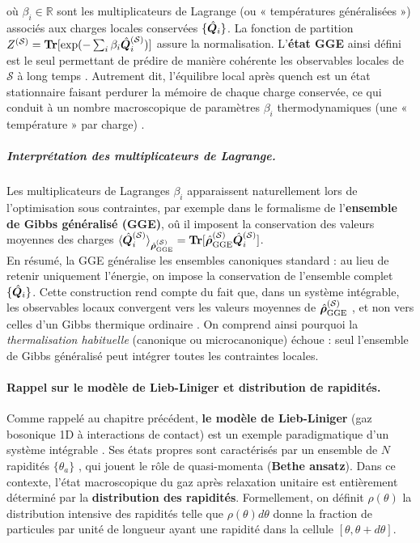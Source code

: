 où $\beta_i \in \mathbb{R}$ sont les multiplicateurs de Lagrange (ou « températures généralisées ») associés aux charges locales conservées $\{\hat{\bm{Q}}_i\}$. La fonction de partition $Z^{(\mathcal{S})} = \bm{\mathrm{Tr}}[\exp ( - \sum_i \beta_i \hat{\bm{Q}}_i^{(\mathcal{S})} ) ]$ assure la normalisation. L’{\bf état GGE} ainsi défini est le seul permettant de prédire de manière cohérente les observables locales de $\mathcal{S}$ à long temps \cite{??}. Autrement dit, l’équilibre local après quench est un état stationnaire faisant perdurer la mémoire de chaque charge conservée, ce qui conduit à un nombre macroscopique de paramètres $\beta_i$ thermodynamiques (une « température » par charge) \cite{??}.

 \subparagraph{Interprétation des multiplicateurs de Lagrange.}
Les multiplicateurs de Lagranges $\beta_i$ apparaissent naturellement lors de l'optimisation sous contraintes, par exemple dans le formalisme de l'{\bf ensemble de Gibbs généralisé (GGE)}, oû il imposent la conservation des valeurs moyennes des charges $\langle \hat{\bm{Q}}_i^{(\mathcal{S})} \rangle_{\hat{\bm{\rho}}^{(\mathcal{S})}_{\mathrm{GGE}}} = \bm{\mathrm{Tr}}[\hat{\bm{\rho}}^{(\mathcal{S})}_{\mathrm{GGE}} \hat{\bm{Q}}_i^{(\mathcal{S})}]   $.\\

En résumé, la GGE généralise les ensembles canoniques standard : au lieu de retenir uniquement l’énergie, on impose la conservation de l’ensemble complet $\{\hat{\bm{Q}}_i \}$. Cette construction rend compte du fait que, dans un système intégrable, les observables locaux convergent vers les valeurs moyennes de $\hat{\bm{\rho}}^{(\mathcal{S})}_{\mathrm{GGE}}$ , et non vers celles d’un Gibbs thermique ordinaire \cite{??}\cite{??}. On comprend ainsi pourquoi la {\em thermalisation habituelle} (canonique ou microcanonique) échoue : seul l’ensemble de Gibbs généralisé peut intégrer toutes les contraintes locales.

\paragraph{Rappel sur le modèle de Lieb-Liniger et distribution de rapidités.}
Comme rappelé au chapitre précédent, {\bf le modèle de  Lieb-Liniger} (gaz bosonique 1D à interactions de contact) est un exemple paradigmatique d’un système intégrable \cite{??}. Ses états propres sont caractérisés par un ensemble de $N$  rapidités $\{ \theta_a \}$ , qui jouent le rôle de quasi-momenta ({\bf Bethe ansatz}). Dans ce contexte, l’état macroscopique du gaz après relaxation unitaire est entièrement déterminé par la {\bf distribution des rapidités}. Formellement, on définit $\rho(\theta)$ la distribution intensive des rapidités telle que $\rho(\theta) d \theta$ donne la fraction de particules par unité de longueur ayant une rapidité dans la cellule $[\theta , \theta + d \theta ] $.\\

